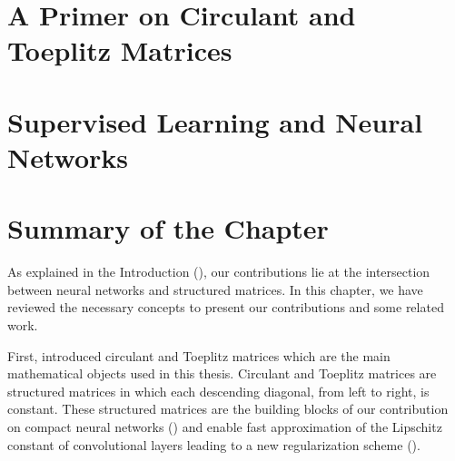 \section{A Primer on Circulant and Toeplitz Matrices}
\label{section:ch2-a_primer_on_circulant_and_toeplitz_matrices}



\section{Supervised Learning and Neural Networks}
\label{section:ch2-supervised_learning_neural_networks}



\section{Summary of the Chapter}
\label{section:ch2-summary_of_the_background}

As explained in the Introduction (), our contributions lie at the intersection between neural networks and structured matrices.
In this chapter, we have reviewed the necessary concepts to present our contributions and some related work.

First,  introduced circulant and Toeplitz matrices which are the main mathematical objects used in this thesis.
Circulant and Toeplitz matrices are structured matrices in which each descending diagonal, from left to right, is constant.
These structured matrices are the building blocks of our contribution on compact neural networks () and enable fast approximation of the Lipschitz constant of convolutional layers leading to a new regularization scheme ().

